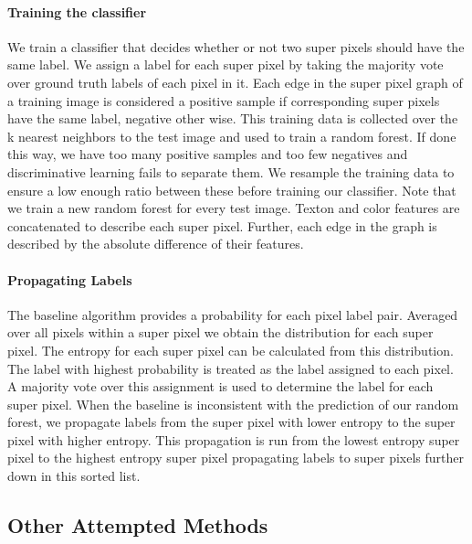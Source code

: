 \documentclass{article} %
\begin{document}
\paragraph{Training the classifier}
We train a classifier that decides whether or not two super pixels should
have the same label.
We assign a label for each super pixel by taking the majority vote over
ground truth labels of each pixel in it.
Each edge in the super pixel graph of a training image is considered a
positive sample if corresponding super pixels have the same label,
negative other wise.
This training data is collected over the k nearest neighbors to the test
image and used to train a random forest.
If done this way, we have too many positive samples and too few negatives
and discriminative learning fails to separate them.
We resample the training data to ensure a low enough ratio between these
before training our classifier.
Note that we train a new random forest for every test image.
Texton and color features are concatenated to describe each super pixel.
Further, each edge in the graph is described by the absolute difference of
their features.

\paragraph{Propagating Labels}
The baseline algorithm provides a probability for each pixel label pair. Averaged over all pixels within a super pixel we obtain the distribution for each super pixel.
The entropy for each super pixel can be calculated from this distribution.
The label with highest probability is treated as the label assigned to
each pixel.
A majority vote over this assignment is used to determine the label for
each super pixel.
When the baseline is inconsistent with the prediction of our random
forest, we propagate labels from the super pixel with lower entropy to
the super pixel with higher entropy.
This propagation is run from the lowest entropy super pixel to the highest
entropy super pixel propagating labels to super pixels further down in
this sorted list.

\subsection{Other Attempted Methods}
\end{document}
